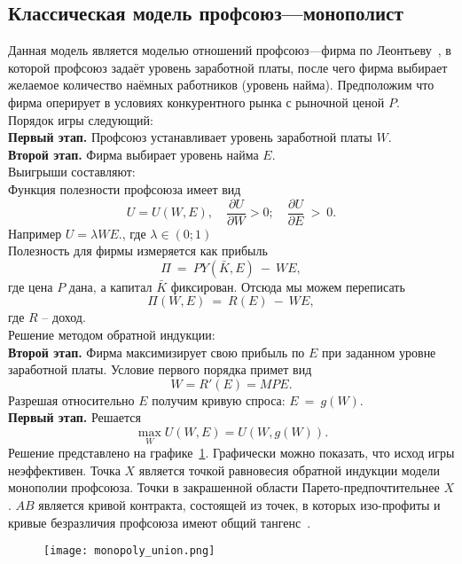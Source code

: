 \subsection{Классическая модель профсоюз---монополист}
\label{sec:monopoly}

Данная модель является моделью отношений профсоюз---фирма по Леонтьеву~\cite{LeontiefW}, в которой профсоюз задаёт уровень заработной платы, после чего фирма выбирает желаемое количество наёмных работников (уровень найма). Предположим что фирма оперирует в условиях конкурентного рынка с рыночной ценой $P$.\\

Порядок игры следующий:\\
\textbf{Первый этап.} Профсоюз устанавливает уровень заработной платы $W$.\\
\textbf{Второй этап.} Фирма выбирает уровень найма $E$.\\

Выигрыши составляют:\\
Функция полезности профсоюза имеет вид 
$$ U = U(W,E), \quad \frac{\partial U}{\partial W} > 0; \quad \frac{\partial U}{\partial E}~>~0.$$ 
Например $U = \lambda WE.$, где $\lambda \in (0; 1)$\\
Полезность для фирмы измеряется как прибыль 
$$\Pi~=~PY(\bar K,E)~-~WE,$$ 
где цена $P$ дана, а капитал $\bar K$ фиксирован. Отсюда мы можем переписать 
$$\Pi(W,E)~=~R(E)~-~WE,$$ 
где $R$ -- доход.\\

Решение методом обратной индукции:\\
\textbf{Второй этап.} Фирма максимизирует свою прибыль по $E$ при заданном уровне заработной платы. Условие первого порядка примет вид
$$ W = R'(E) = MPE. $$
Разрешая относительно $E$ получим кривую спроса: $E~=~g(W)$.\\
\textbf{Первый этап.} Решается
$$ \max_W U(W,E) = U(W,g(W)). $$
Решение представлено на графике~\ref{fig:monopoly_union}. Графически можно показать, что исход игры неэффективен. Точка $X$ является точкой равновесия обратной индукции модели монополии профсоюза. Точки в закрашенной области Парето-предпочтительнее $X$. $AB$ является кривой контракта, состоящей из точек, в которых изо-профиты и кривые безразличия профсоюза имеют общий тангенс~\cite{ShandongUniver}.


\begin{figure}[h]
	\texttt{[image: monopoly\_union.png]}
	\caption{}
	\label{fig:monopoly_union}
\end{figure}

